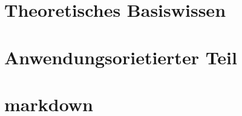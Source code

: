 \documentclass[12pt,a4paper]{article}
\begin{document}
\linenumbers %
\modulolinenumbers[5] %
\setlength\linenumbersep{1cm} %


 


\newpage
\section{Theoretisches Basiswissen} \label{ch:theorie}


\newpage
\section{Anwendungsorietierter Teil} \label{ch:praxis}


\newpage
\section{markdown} \label{ch:markdown}



\newpage


%
%
%
\end{document}

